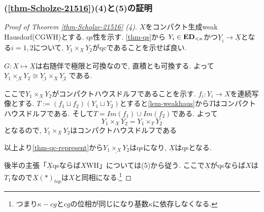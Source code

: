 \documentclass[dvipdfmx,a4paper,11pt]{article}
\theoremstyle{definition}
\begin{document}
\subsubsection{\cite[Proposition 2.15, Theorem 2.16]{Sch19}(\ref{thm-Scholze-21516})(4)と(5)の証明}

\begin{proof}[Proof of Theorem \ref{thm-Scholze-21516} (4)]

$X$をコンパクト生成weak Hausdorf(CGWH)とする.
qs性を示す. \ref{thm-qs}から
$Y_i \in {\bf ED}_{< \kappa}$かつ$\underline{Y}_{i} \to \underline{X}$となる$i=1,2$について, 
$\underline{Y_1} \times_{\underline{X}} \underline{Y_2}$がqcであることを示せば良い. 

$G : X \mapsto \underline{X} $は右随伴で極限と可換なので, 直積とも可換する.
よって
$\underline{Y_1 \times_{X} Y_2} \cong \underline{Y_1} \times_{\underline{X}} \underline{Y_2}$
である.

ここで$Y_1 \times_{X} Y_2$がコンパクトハウスドルフであることを示す. 
$f_i : Y_i \to X$を連続写像とする. 
$T := (f_1 \sqcup f_2)(Y_1 \sqcup Y_2)$とすると\ref{lem-weakhaus}から$T$はコンパクトハウスドルフである.
そして$T = Im(f_1) \cup Im(f_2)$である. 
よって
$$
Y_1 \times_{X} Y_2 = Y_1 \times_{T} Y_2
$$
となるので, $Y_1 \times_{X} Y_2$はコンパクトハウスドルフである

以上より\ref{thm-qc-represent}から$\underline{Y_1 \times_{X} Y_2}$はqsになり, $\underline{X}$はqsとなる. 

後半の主張「$\underline{X}$qsならば$X$WH」については(5)から従う. 
ここで$\underline{X}$がqsならば$X$は$T_1$なので$\underline{X}(\ast)_{top} $は$X$と同相になる.\footnote{つまり$\kappa-cg$と$cg$の位相が同じになり基数$\kappa$に依存しなくなる. } 

\end{proof}
\end{document}
